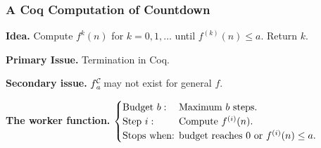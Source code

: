 \begin{frame}[fragile]
\frametitle{A Coq Computation of Countdown}
\textbf{Idea.} %
Compute $f^{k}(n)$ for $k=0, 1,\ldots$ until $f^{(k)}(n)\le a$. Return $k$.

\bigskip

\pause 
\textbf{Primary Issue.} Termination in Coq.

\bigskip

\textbf{Secondary issue.} $\cdt{f}{a}$ may not exist for general $f$.

\bigskip

\pause 
\textbf{The worker function.} $\begin{cases}
\text{Budget } b: & \hspace{-1em}\text{Maximum } b \text{ steps. } \\
\text{Step } i: & \hspace{-1em}\text{Compute } f^{(i)}(n). \\
\text{Stops when: } & \hspace{-1em}\text{budget reaches } 0 \text{ or } f^{(i)}(n) \le a.
\end{cases}$

\end{frame}


